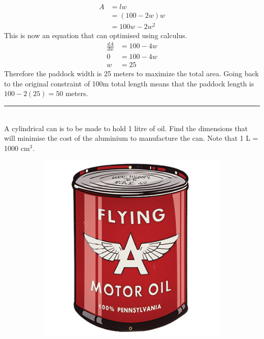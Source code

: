 \begin{align*}
A&=lw\\
&=\left(100-2w\right)w\\
&=100w-2w^2
\end{align*}
This is now an equation that can optimised using calculus.
\begin{align*}
\frac{dA}{dw}&=100-4w\\
0&=100-4w\\
w&=25
\end{align*}
Therefore the paddock width is 25 meters to maximize the total area. Going back to the original constraint of 100m total length means that the paddock length is $100-2(25)=50$ meters.\\
\rule{6.8cm}{0.5pt}\\
\example A cylindrical can is to be made to hold 1 litre of oil. Find the dimensions that will minimise the cost of the aluminium to manufacture the can. Note that 1 L = 1000 cm$^3$.\\

\begin{figure}[h]
	\centering
	\begin{subfigure}[h]{0.4\textwidth}
		\includegraphics[width=\textwidth]{graphics/oilCan}
	\end{subfigure}
	\begin{subfigure}[h]{0.4\textwidth}
	\end{subfigure}
\end{figure}

